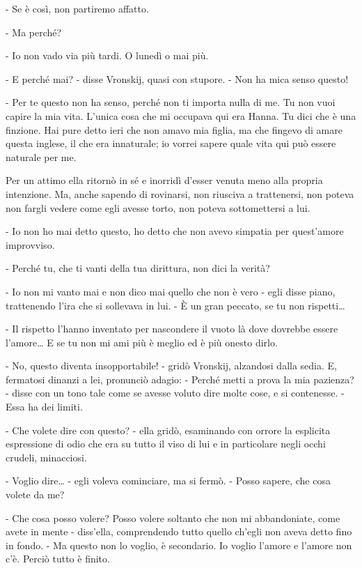 - Se è così, non partiremo affatto. 

- Ma perché? 

- Io non vado via più tardi. O lunedì o mai più. 

- E perché mai? - disse Vronskij, quasi con stupore. - Non ha mica senso questo! 

- Per te questo non ha senso, perché non ti importa nulla di me. Tu non vuoi capire la mia vita. L'unica cosa che mi occupava qui era Hanna. Tu dici che è una finzione. Hai pure detto ieri che non amavo mia figlia, ma che fingevo di amare questa inglese, il che era innaturale; io vorrei sapere quale vita qui può essere naturale per me. 

Per un attimo ella ritornò in sé e inorridì d'esser venuta meno alla propria intenzione. Ma, anche sapendo di rovinarsi, non riusciva a trattenersi, non poteva non fargli vedere come egli avesse torto, non poteva sottomettersi a lui. 

- Io non ho mai detto questo, ho detto che non avevo simpatia per quest'amore improvviso. 

- Perché tu, che ti vanti della tua dirittura, non dici la verità? 

- Io non mi vanto mai e non dico mai quello che non è vero - egli disse piano, trattenendo l'ira che si sollevava in lui. - È un gran peccato, se tu non rispetti\ldots{} 

- Il rispetto l'hanno inventato per nascondere il vuoto là dove dovrebbe essere l'amore\ldots{} E se tu non mi ami più è meglio ed è più onesto dirlo. 

- No, questo diventa insopportabile! - gridò Vronskij, alzandosi dalla sedia. E, fermatosi dinanzi a lei, pronunciò adagio: - Perché metti a prova la mia pazienza? - disse con un tono tale come se avesse voluto dire molte cose, e si contenesse. - Essa ha dei limiti. 

- Che volete dire con questo? - ella gridò, esaminando con orrore la esplicita espressione di odio che era su tutto il viso di lui e in particolare negli occhi crudeli, minacciosi. 

- Voglio dire\ldots{} - egli voleva cominciare, ma si fermò. - Posso sapere, che cosa volete da me? 

- Che cosa posso volere? Posso volere soltanto che non mi abbandoniate, come avete in mente - diss'ella, comprendendo tutto quello ch'egli non aveva detto fino in fondo. - Ma questo non lo voglio, è secondario. Io voglio l'amore e l'amore non c'è. Perciò tutto è finito. 

